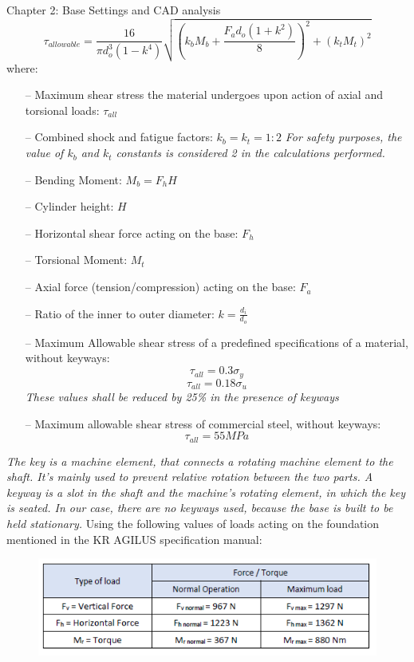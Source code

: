 \documentclass{book}
\begin{document}
\begin{chapter}{Chapter 2: Base Settings and CAD analysis}
\begin{equation}
\tau_{allowable} = \frac{16}{\pi d^{3}_{o} (1-k^{4})} \sqrt{(k_{b} M_{b} + \frac{F_{a} d_{o} (1+k^{2})}{8})^{2} + (k_{t} M_{t})^{2}}
\end{equation}
where:
\begin{itemize}
	\item [--] Maximum shear stress the material undergoes upon action of axial and torsional loads: $\tau_{all}$
	\item [--] Combined shock and fatigue factors: $k_{b} = k_{t} = 1 : 2 $
	\textit{For safety purposes, the value of $k_{b}$ and $k_{t}$ constants is considered 2 in the calculations performed.}
    \item [--] Bending Moment: $M_{b} = F_{h} H$
	\item [--] Cylinder height: $H$
	\item [--] Horizontal shear force acting on the base: $F_{h}$
	\item [--] Torsional Moment: $M_{t}$
	\item [--] Axial force (tension/compression) acting on the base: $F_{a}$
	\item [--] Ratio of the inner to outer diameter: $k = \frac{d_{i}}{d_{o}}$
	\item [--] Maximum Allowable shear stress of a predefined specifications of a material, without keyways:
	$$ \tau_{all} = 0.3 \sigma_{y} $$
	$$ \tau_{all} = 0.18 \sigma_{u} $$
	\textit{These values shall be reduced by 25\% in the presence of keyways}
	\item [--] Maximum allowable shear stress of commercial steel, without keyways:
	$$ \tau_{all} = 55 MPa $$
\end{itemize}

\textit{The key is a machine element, that connects a rotating machine element to the shaft. It’s mainly used to prevent relative rotation between the two parts. A keyway is a slot in the shaft and the machine’s rotating element, in which the key is seated. In our case, there are no keyways used, because the base is built to be held stationary.}
\vspace{0.3 cm}
\newline Using the following values of loads acting on the foundation mentioned in the KR AGILUS specification manual:
\begin{figure}[H]
\begin{center}
	\includegraphics[scale = 0.95]{Loads}
\end{center}	
\end{figure}


\end{chapter}
\end{document}
